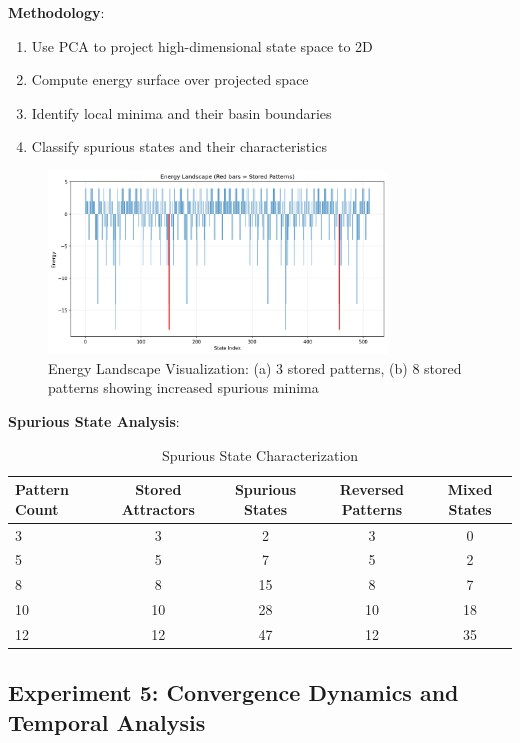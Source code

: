 \documentclass[11pt,a4paper]{article}
\begin{document}
\textbf{Methodology}:
\begin{enumerate}
    \item Use PCA to project high-dimensional state space to 2D
    \item Compute energy surface over projected space
    \item Identify local minima and their basin boundaries
    \item Classify spurious states and their characteristics
\end{enumerate}

\begin{figure}[H]
\centering
\includegraphics[width=0.8\textwidth]{energy_landscape.png}
\caption{Energy Landscape Visualization: (a) 3 stored patterns, (b) 8 stored patterns showing increased spurious minima}
\label{fig:energy_landscape}
\end{figure}

\textbf{Spurious State Analysis}:

\begin{table}[H]
\centering
\caption{Spurious State Characterization}
\begin{tabular}{@{}lcccc@{}}
\toprule
Pattern Count & Stored Attractors & Spurious States & Reversed Patterns & Mixed States \\
\midrule
3 & 3 & 2 & 3 & 0 \\
5 & 5 & 7 & 5 & 2 \\
8 & 8 & 15 & 8 & 7 \\
10 & 10 & 28 & 10 & 18 \\
12 & 12 & 47 & 12 & 35 \\
\bottomrule
\end{tabular}
\label{tab:spurious_states}
\end{table}

\subsection{Experiment 5: Convergence Dynamics and Temporal Analysis}
\end{document}
